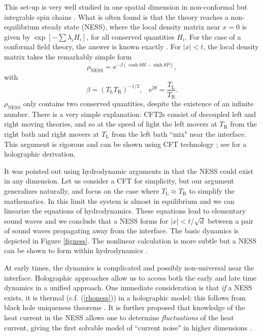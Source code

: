 \documentclass[10pt, oneside]{book}
\begin{document}
\begin{doublespace}
This set-up is very well studied in one spatial dimension in non-conformal but integrable spin chains \cite{} .   What is often found is that the theory reaches a non-equilibrium steady state (NESS),  where the local density matrix near $x=0$ is given by $\exp[-\sum \lambda_i H_i]$, for all conserved quantities $H_i$.   For the case of a conformal field theory, the answer is known exactly \cite{Bernard:2012je}.   For $|x|<t$,  the local density matrix takes the remarkably simple form \begin{equation}
\rho_{\mathrm{NESS}} =  \mathrm{e}^{-\beta(\cosh\theta H - \sinh\theta P)}, \label{rhoness}
\end{equation}
with \begin{equation}
\beta = (T_{\mathrm{L}}T_{\mathrm{R}})^{-1/2},\;\;\; \mathrm{e}^{2\theta} = \frac{T_{\mathrm{L}}}{T_{\mathrm{R}}}.
\end{equation}
$\rho_{\mathrm{NESS}}$ only contains two conserved quantities, despite the existence of an infinite number.  There is a very simple explanation: CFT2s consist of decoupled left and right moving theories, and so at the speed of light the left movers at $T_{\mathrm{R}}$ from the right bath and right movers at $T_{\mathrm{L}}$ from the left bath ``mix" near the interface.  This argument is rigorous and can be shown using CFT technology \cite{Bernard:2012je}; see \cite{bhaseenNP} for a holographic derivation.  

It was pointed out using hydrodynamic arguments in \cite{bhaseenNP,  Chang:2013gba} that the NESS could exist in any dimension.   Let us consider a CFT for simplicity, but our argument generalizes naturally, and focus on the case where $T_{\mathrm{L}}\approx T_{\mathrm{R}}$ to simplify the mathematics.   In this limit the system is almost in equilibrium and we can linearize the equations of hydrodynamics.   These equations lead to elementary sound waves and we conclude  that a NESS forms for $|x|<t/\sqrt{d}$ between a pair of sound waves propagating away from the interface.  The basic dynamics is depicted in Figure \ref{figness}.   The nonlinear calculation is more subtle but a NESS can be shown to form within hydrodynamics \cite{Lucas:2015hnv, Spillane:2015daa}.

At early times, the dynamics is complicated and possibly non-universal near the interface.   Holographic approaches \cite{Amado:2015uza} allow us to access both the early and late time dynamics in a unified approach.   One immediate consideration is that \emph{if} a NESS exists, it is thermal (c.f. (\ref{rhoness})) in a holographic model:  this follows from black hole uniqueness theorems \cite{bhaseenNP}.  It is further proposed that knowledge of the heat current in the NESS allows one to determine \emph{fluctuations} of the heat current, giving the first solvable model of ``current noise" in higher dimensions \cite{bhaseenNP}. 




\end{doublespace}
\end{document}
